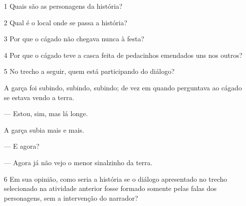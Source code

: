
\num{1} Quais são as personagens da história?


\num{2} Qual é o local onde se passa a história?


\num{3} Por que o cágado não chegava nunca à festa?


\num{4} Por que o cágado teve a casca feita de pedacinhos emendados uns nos
outros?

\num{5} No trecho a seguir, quem está participando do diálogo?

\begin{myquote}
A garça foi subindo, subindo, subindo; de vez em quando perguntava ao
cágado se estava vendo a terra.

--- Estou, sim, mas lá longe.

A garça subia mais e mais.

--- E agora?

--- Agora já não vejo o menor sinalzinho da terra.
\end{myquote}


\num{6} Em sua opinião, como seria a história se o diálogo apresentado no trecho selecionado na atividade anterior fosse formado
somente pelas falas dos personagens, sem a intervenção do narrador?


